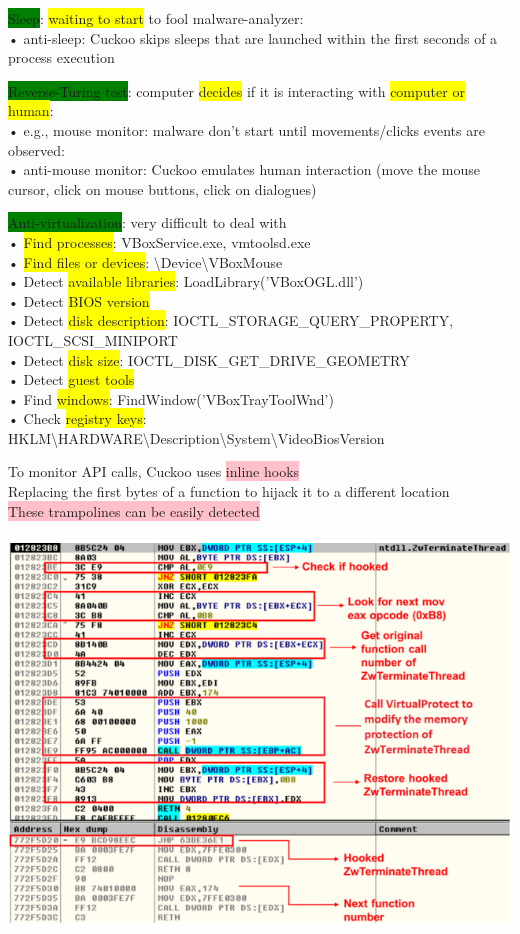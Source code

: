 \documentclass[]{project_plan}
\begin{document}
\colorbox{green}{Sleep}: \colorbox{yellow}{waiting to start} to fool malware-analyzer:\\
• anti-sleep: Cuckoo skips sleeps that are launched within the first seconds of a process execution

\colorbox{green}{Reverse-Turing test}: computer \colorbox{yellow}{decides} if it is interacting with \colorbox{yellow}{computer or human}:\\
• e.g., mouse monitor: malware don’t start until movements/clicks events are observed:\\
• anti-mouse monitor: Cuckoo emulates human interaction (move the mouse cursor, click on mouse buttons, click
on dialogues)

\colorbox{green}{Anti-virtualization}: very difficult to deal with\\
• \colorbox{yellow}{Find processes}: VBoxService.exe, vmtoolsd.exe\\
• \colorbox{yellow}{Find files or devices}: \textbackslash Device\textbackslash VBoxMouse\\
• Detect \colorbox{yellow}{available libraries}: LoadLibrary('VBoxOGL.dll')\\
• Detect \colorbox{yellow}{BIOS version}\\
• Detect \colorbox{yellow}{disk description}: IOCTL\_STORAGE\_QUERY\_PROPERTY,
IOCTL\_SCSI\_MINIPORT\\
• Detect \colorbox{yellow}{disk size}: IOCTL\_DISK\_GET\_DRIVE\_GEOMETRY\\
• Detect \colorbox{yellow}{guest tools}\\
• Find \colorbox{yellow}{windows}: FindWindow('VBoxTrayToolWnd')\\
• Check \colorbox{yellow}{registry keys}:\\
HKLM\textbackslash HARDWARE\textbackslash Description\textbackslash System\textbackslash VideoBiosVersion

To monitor API calls, Cuckoo uses \colorbox{pink}{inline hooks}\\
Replacing the first bytes of a function to hijack it to a different location\\
\colorbox{pink}{These trampolines can be easily detected}

\includegraphics[width=.5\linewidth]{trampolines.png}
\end{document}
